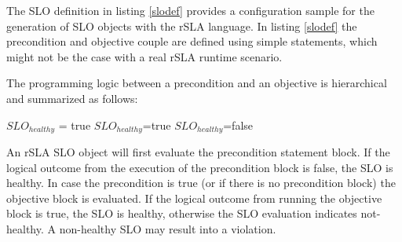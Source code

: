 The SLO definition in listing \ref{slodef} provides a configuration sample for the generation of SLO objects with the rSLA language. In listing \ref{slodef} the precondition and objective couple are defined using simple statements, which might not be the case with a real rSLA runtime scenario.

The programming logic between a precondition and an objective is hierarchical and summarized as follows:
\begin{algorithmic}
    \STATE $SLO_{healthy}$ = true
   \STATE $SLO_{healthy}$=true
\ELSE
\STATE $SLO_{healthy}$=false
  \ENDIF 
\end{algorithmic}

An rSLA SLO object will first evaluate the precondition statement block. If the logical outcome from the execution of the precondition block is false, the SLO is healthy. 
In case the precondition is true (or if there is no precondition block) the objective block is evaluated. If the logical outcome from running the objective block is true, the SLO is healthy, otherwise the SLO evaluation indicates not-healthy. A non-healthy SLO may result into a violation.